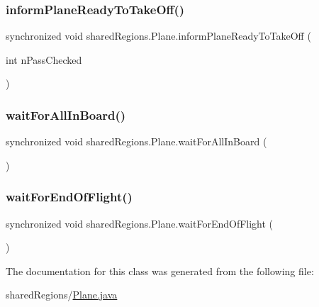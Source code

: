 \subsubsection{\texorpdfstring{inform\+Plane\+Ready\+To\+Take\+Off()}{informPlaneReadyToTakeOff()}}
{\footnotesize\ttfamily synchronized void shared\+Regions.\+Plane.\+inform\+Plane\+Ready\+To\+Take\+Off (\begin{DoxyParamCaption}\item[{int}]{n\+Pass\+Checked }\end{DoxyParamCaption})}

\mbox{\label{classshared_regions_1_1_plane_a8520969010cb85cbff07deb3f1a0f003}} 
\subsubsection{\texorpdfstring{wait\+For\+All\+In\+Board()}{waitForAllInBoard()}}
{\footnotesize\ttfamily synchronized void shared\+Regions.\+Plane.\+wait\+For\+All\+In\+Board (\begin{DoxyParamCaption}{ }\end{DoxyParamCaption})}

\mbox{\label{classshared_regions_1_1_plane_a5a0b3cd50c5832849185293e70d9725b}} 
\subsubsection{\texorpdfstring{wait\+For\+End\+Of\+Flight()}{waitForEndOfFlight()}}
{\footnotesize\ttfamily synchronized void shared\+Regions.\+Plane.\+wait\+For\+End\+Of\+Flight (\begin{DoxyParamCaption}{ }\end{DoxyParamCaption})}



The documentation for this class was generated from the following file\+:\begin{DoxyCompactItemize}
\item 
shared\+Regions/\hyperlink{_plane_8java}{Plane.\+java}\end{DoxyCompactItemize}
